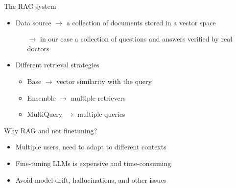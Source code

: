 \documentclass[handout]{beamer}\mode<handout>{\usetheme{AMSBolognaFC}}
\begin{document}
\begin{frame}[allowframebreaks]
    \begin{block}{The RAG system}
        \begin{itemize}
            \item Data source $\rightarrow$ a collection of documents stored in a vector space
            \begin{itemize}
                \item[$\rightarrow$] in our case a collection of questions and answers verified by real doctors
            \end{itemize}
            \item Different retrieval strategies
            \begin{itemize}
                \item Base $\rightarrow$ vector similarity with the query
                \item Ensemble $\rightarrow$ multiple retrievers
                \item MultiQuery $\rightarrow$ multiple queries
            \end{itemize}
        \end{itemize}
    \end{block}
    \begin{block}{Why RAG and not finetuning?}
        \begin{itemize}
            \item Multiple users, need to \alert{adapt} to different contexts
            \item Fine-tuning LLMs is expensive and time-consuming
            \item Avoid model \alert{drift}, \alert{hallucinations}, and other issues
        \end{itemize}
    \end{block}
\end{frame}
\end{document}
